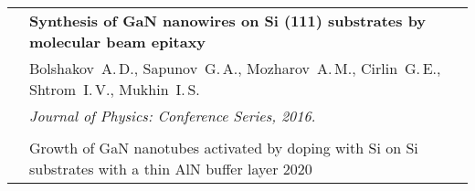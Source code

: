 \documentclass[letterpaper, 11pt]{article}
\begin{document}
\begin{longtable}{p{1.3in}p{4.8in}}
        & \textbf{Synthesis of GaN nanowires on Si (111) substrates by
        molecular beam epitaxy} \\
        & Bolshakov~A.\,D., Sapunov~G.\,A., Mozharov~A.\,M., Cirlin~G.\,E.,
        Shtrom~I.\,V., Mukhin~I.\,S. \\
		& \textit{Journal of Physics: Conference Series, 2016.}\\
		& \\

		{\color{OliveGreen}{Patent}}
        & Growth of GaN nanotubes activated by doping with Si on Si substrates
        with a thin AlN buffer layer \hfill 2020\\
		
		
		
		
	\end{longtable}
\end{document}
